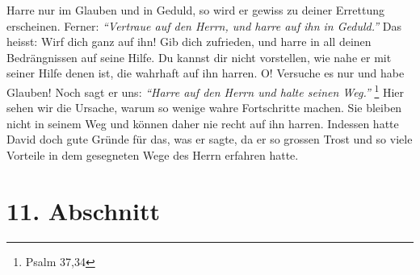 Harre nur im Glauben und in Geduld, so wird er gewiss zu deiner Errettung
erscheinen. Ferner:
\textit{"`Vertraue auf den Herrn, und harre auf ihn in Geduld."'} Das
heisst: Wirf dich ganz auf ihn! Gib dich zufrieden, und harre in all deinen
Bedrängnissen auf seine Hilfe. Du kannst dir nicht vorstellen, wie nahe er mit
seiner Hilfe denen ist, die wahrhaft auf ihn harren. O! Versuche es nur und habe
Glauben! Noch sagt er uns:
\textit{"`Harre auf den Herrn und halte seinen Weg."'}
\footnote{Psalm 37,34}
Hier sehen wir die Ursache, warum so wenige wahre
Fortschritte machen. Sie bleiben nicht in seinem Weg und können daher nie
recht auf ihn harren. Indessen hatte David doch gute Gründe für das, was er
sagte, da er so grossen Trost und so viele Vorteile in dem gesegneten Wege des
Herrn erfahren hatte.

\section{11. Abschnitt} \label{kap6_ab11}

